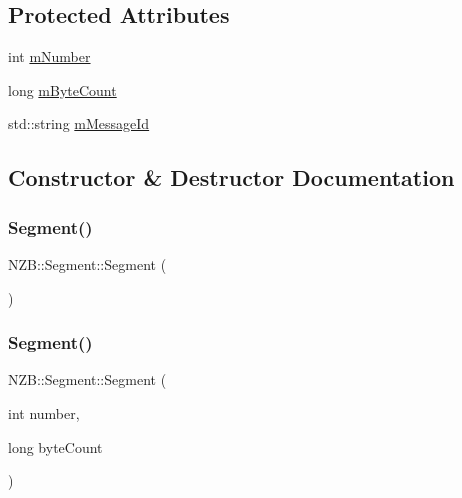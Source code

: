 \subsection*{Protected Attributes}
\begin{DoxyCompactItemize}
\item 
int \hyperlink{class_n_z_b_1_1_segment_a56fbe9c8df52fae770045ab2627c6e73}{m\+Number}
\item 
long \hyperlink{class_n_z_b_1_1_segment_ab833915d89f52af672cf0de3a61bcb07}{m\+Byte\+Count}
\item 
std\+::string \hyperlink{class_n_z_b_1_1_segment_a3be7a11e0853e5eebb4153c05d663edc}{m\+Message\+Id}
\end{DoxyCompactItemize}


\subsection{Constructor \& Destructor Documentation}
\hypertarget{class_n_z_b_1_1_segment_a03b10b10c16c1906ec1c77f063dbf1b7}{}\label{class_n_z_b_1_1_segment_a03b10b10c16c1906ec1c77f063dbf1b7} 
\subsubsection{\texorpdfstring{Segment()}{Segment()}\hspace{0.1cm}{\footnotesize\ttfamily [1/5]}}
{\footnotesize\ttfamily N\+Z\+B\+::\+Segment\+::\+Segment (\begin{DoxyParamCaption}{ }\end{DoxyParamCaption})\hspace{0.3cm}{\ttfamily [inline]}}

\hypertarget{class_n_z_b_1_1_segment_af4eb50bef48807f205ddc5cf1a0f9b20}{}\label{class_n_z_b_1_1_segment_af4eb50bef48807f205ddc5cf1a0f9b20} 
\subsubsection{\texorpdfstring{Segment()}{Segment()}\hspace{0.1cm}{\footnotesize\ttfamily [2/5]}}
{\footnotesize\ttfamily N\+Z\+B\+::\+Segment\+::\+Segment (\begin{DoxyParamCaption}\item[{int}]{number,  }\item[{long}]{byte\+Count }\end{DoxyParamCaption})}

